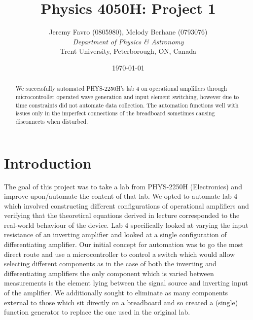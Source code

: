 \documentclass[10pt]{article}
\title{Physics 4050H: Project 1}
\author{Jeremy Favro (0805980), Melody Berhane (0793076) \\\emph{Department of Physics \& Astronomy}\\ Trent University, Peterborough, ON, Canada}
\date{\today}
\theoremstyle{definition}
\begin{document}
\maketitle

\begin{abstract}
  We successfully automated PHYS-2250H's lab 4 on operational amplifiers through microcontroller operated
  wave generation and input element switching, however due to time constraints did not automate data collection.
  The automation functions well with issues only in the imperfect connections of the breadboard sometimes causing
  disconnects when disturbed.
\end{abstract}
\section{Introduction}
The goal of this project was to take a lab from PHYS-2250H (Electronics) and improve upon/automate the content of that lab. We opted to
automate lab 4 which involved constructing different configurations of operational amplifiers and verifying that the theoretical equations
derived in lecture corresponded to the real-world behaviour of the device. Lab 4 specifically looked at varying the input resistance of an
inverting amplifier and looked at a single configuration of differentiating amplifier. Our initial concept for automation was to go the most direct route
and use a microcontroller to control a switch which would allow selecting different components as in the case of both the inverting and differentiating amplifiers
the only component which is varied between measurements is the element lying between the signal source and inverting input of the amplifier. We additionally
sought to eliminate as many components external to those which sit directly on a breadboard and so created a (single) function generator to replace the one used in the original lab.
\newpage
\end{document}
